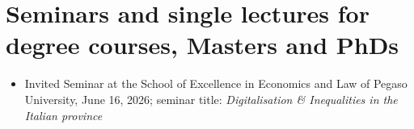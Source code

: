 \documentclass[11pt,a4paper,sans]{moderncv} %
\begin{document}


\section{\textbf{Seminars and single lectures for degree courses, Masters and PhDs}}

\vspace{6pt}

\begin{itemize}

    \item Invited Seminar at the School of Excellence in Economics and Law of Pegaso University, June 16, 2026; seminar title: \textit{Digitalisation \& Inequalities in the Italian province}    
    

\end{itemize}
\end{document}
